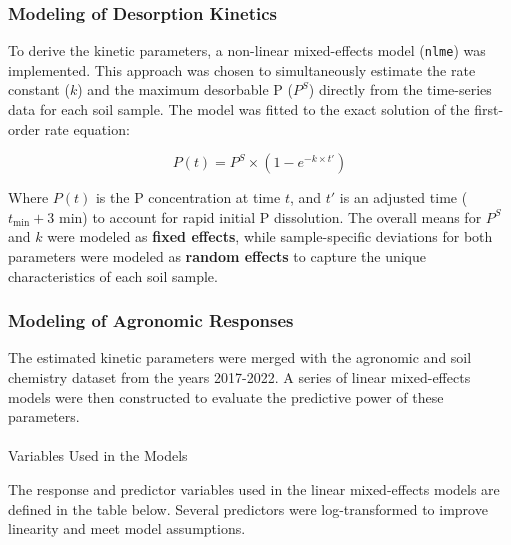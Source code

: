 \documentclass[
  letterpaper,
  DIV=11,
  numbers=noendperiod]{scrartcl}
\makeatletter
\let\oldparagraph\paragraph
\renewcommand{\paragraph}{
    \@ifstar
      \xxxParagraphStar
      \xxxParagraphNoStar
  }
\newcommand{\xxxParagraphStar}[1]{\oldparagraph*{#1}\mbox{}}
\newcommand{\xxxParagraphNoStar}[1]{\oldparagraph{#1}\mbox{}}
\makeatother
\begin{document}
\subsubsection{Modeling of Desorption
Kinetics}\label{modeling-of-desorption-kinetics}

To derive the kinetic parameters, a non-linear mixed-effects model
(\texttt{nlme}) was implemented. This approach was chosen to
simultaneously estimate the rate constant (\(k\)) and the maximum
desorbable P (\(P^S\)) directly from the time-series data for each soil
sample. The model was fitted to the exact solution of the first-order
rate equation:

\[ P(t) = P^S \times (1 - e^{-k \times t'}) \]

Where \(P(t)\) is the P concentration at time \(t\), and \(t'\) is an
adjusted time (\(t_\text{min} + 3\) min) to account for rapid initial P
dissolution. The overall means for \(P^S\) and \(k\) were modeled as
\textbf{fixed effects}, while sample-specific deviations for both
parameters were modeled as \textbf{random effects} to capture the unique
characteristics of each soil sample.

\subsubsection{Modeling of Agronomic
Responses}\label{modeling-of-agronomic-responses}

The estimated kinetic parameters were merged with the agronomic and soil
chemistry dataset from the years 2017-2022. A series of linear
mixed-effects models were then constructed to evaluate the predictive
power of these parameters.

\paragraph{Variables Used in the
Models}\label{variables-used-in-the-models}

The response and predictor variables used in the linear mixed-effects
models are defined in the table below. Several predictors were
log-transformed to improve linearity and meet model assumptions.
\end{document}
